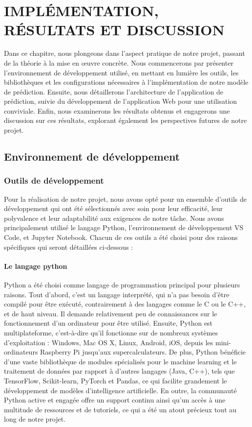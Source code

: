 \chapter{IMPLÉMENTATION, RÉSULTATS ET DISCUSSION}
\begin{spacing}{1.2}
\minitoc
\thispagestyle{MyStyle}
\end{spacing}
\newpage

Dans ce chapitre, nous plongeons dans l'aspect pratique de notre projet, passant de la théorie à la mise en œuvre concrète. Nous commencerons par présenter l'environnement de développement utilisé, en mettant en lumière les outils, les bibliothèques et les configurations nécessaires à l'implémentation de notre modèle de prédiction. Ensuite, nous détaillerons l'architecture de l'application de prédiction, suivie du développement de l'application Web pour une utilisation conviviale. Enfin, nous examinerons les résultats obtenus et engagerons une discussion sur ces résultats, explorant également les perspectives futures de notre projet.

\section{Environnement de développement}

\subsection{Outils de développement}
Pour la réalisation de notre projet, nous avons opté pour un ensemble d'outils de développement qui ont été sélectionnés avec soin pour leur efficacité, leur polyvalence et leur adaptabilité aux exigences de notre tâche. Nous avons principalement utilisé le langage Python, l'environnement de développement VS Code, et Jupyter Notebook. Chacun de ces outils a été choisi pour des raisons spécifiques qui seront détaillées ci-dessous :

\subsubsection{Le langage python}
Python a été choisi comme langage de programmation principal pour plusieurs raisons. Tout d'abord, c'est un langage interprété, qui n'a pas besoin d'être compilé pour être exécuté, contrairement à des langages comme le C ou le C++, et de haut niveau. Il demande relativement peu de connaissances sur le fonctionnement d'un ordinateur pour être utilisé. Ensuite, Python est multiplateforme, c'est-à-dire qu'il fonctionne sur de nombreux systèmes d'exploitation : Windows, Mac OS X, Linux, Android, iOS, depuis les mini-ordinateurs Raspberry Pi jusqu'aux supercalculateurs. De plus, Python bénéficie d'une vaste bibliothèque de modules spécialisés pour le machine learning et le traitement de données par rapport à d'autres langages (Java, C++), tels que TensorFlow, Scikit-learn, PyTorch et Pandas, ce qui facilite grandement le développement de modèles d'intelligence artificielle. En outre, la communauté Python active et engagée offre un support continu ainsi qu'un accès à une multitude de ressources et de tutoriels, ce qui a été un atout précieux tout au long de notre projet.

